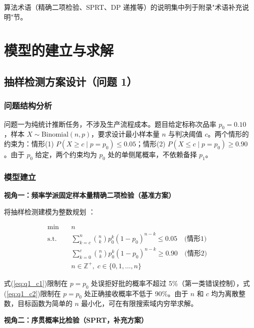 \documentclass[12pt,a4paper]{ctexart}
\begin{document}
算法术语（精确二项检验、SPRT、DP 递推等）的说明集中列于附录"术语补充说明"节。

\section{模型的建立与求解}

\subsection{抽样检测方案设计（问题 1）}

\subsubsection{问题结构分析}

问题一为纯统计推断任务，不涉及生产流程成本。题目给定标称次品率 $p_0=0.10$，样本 $X\sim\text{Binomial}(n,p)$，要求设计最小样本量 $n$ 与判决阈值 $c$。两个情形的约束为：情形(1) $P(X\ge c\mid p=p_0)\le 0.05$；情形(2) $P(X\le c\mid p=p_0)\ge 0.90$。由于 $p_0$ 给定，两个约束均为 $p_0$ 处的单侧尾概率，不依赖备择 $p_1$。

\subsubsection{模型建立}

\textbf{视角一：频率学派固定样本量精确二项检验（基准方案）}

将抽样检测建模为整数规划 \cite{ref2}：

\begin{align}
\min \quad & n \label{eq:q1_obj} \\
\text{s.t.} \quad & \sum_{k=c}^{n} \binom{n}{k} p_0^k (1-p_0)^{n-k} \le 0.05 \quad \text{(情形1)} \label{eq:q1_c1} \\
& \sum_{k=0}^{c} \binom{n}{k} p_0^k (1-p_0)^{n-k} \ge 0.90 \quad \text{(情形2)} \label{eq:q1_c2} \\
& n \in \mathbb{Z}^+,\; c \in \{0,1,\dots,n\} \nonumber
\end{align}

式(\ref{eq:q1_c1})限制在 $p=p_0$ 处误拒好批的概率不超过 5\%（第一类错误控制），式(\ref{eq:q1_c2})限制在 $p=p_0$ 处正确接收概率不低于 90\%。由于 $n$ 和 $c$ 均为离散整数，目标函数为简单的 $n$ 最小化，可在有限搜索域内穷举求解。

\textbf{视角二：序贯概率比检验（SPRT，补充方案）}
\end{document}
